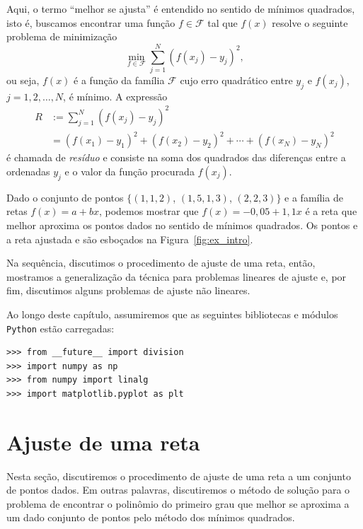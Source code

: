 Aqui, o termo ``melhor se ajusta'' é entendido no sentido de mínimos quadrados, isto é, buscamos encontrar uma função $f\in\mathcal{F}$ tal que $f(x)$ resolve o seguinte problema de minimização
\begin{equation*}
  \min_{f\in\mathcal{F}} \sum_{j=1}^N \left(f(x_j) - y_j\right)^2,
\end{equation*}
ou seja, $f(x)$ é a função da família $\mathcal{F}$ cujo erro quadrático entre $y_j$ e $f(x_j)$, $j = 1, 2, \dotsc, N$, é mínimo. A expressão
\begin{equation*}
  \begin{split}
  R &:= \sum_{j=1}^N \left(f(x_j)-y_j\right)^2 \\
  &= \left(f(x_1)-y_1\right)^2 +  \left(f(x_2)-y_2\right)^2 + \cdots + \left(f(x_N)- y_N\right)^2    
  \end{split}
\end{equation*}
é chamada de \emph{resíduo} e consiste na soma dos quadrados das diferenças entre a ordenadas $y_j$ e o valor da função procurada $f(x_j)$.

\begin{ex}\label{ex:intro_ajuste}
  Dado o conjunto de pontos $\{(1, 1,2)$, $(1,5, 1,3)$, $(2, 2,3)\}$ e a família de retas $f(x) = a + bx$, podemos mostrar que $f(x) = -0,05 + 1,1x$ é a reta que melhor aproxima os pontos dados no sentido de mínimos quadrados.  Os pontos e a reta ajustada e são esboçados na Figura~\ref{fig:ex_intro}.
\end{ex}

Na sequência, discutimos o procedimento de ajuste de uma reta, então, mostramos a generalização da técnica para problemas lineares de ajuste e, por fim, discutimos alguns problemas de ajuste não lineares.

\ifispython
  Ao longo deste capítulo, assumiremos que as seguintes bibliotecas e módulos \verb+Python+ estão carregadas:
\begin{verbatim}
>>> from __future__ import division
>>> import numpy as np
>>> from numpy import linalg
>>> import matplotlib.pyplot as plt
\end{verbatim}
\fi


\section{Ajuste de uma reta}

Nesta seção, discutiremos o procedimento de ajuste de uma reta a um conjunto de pontos dados. Em outras palavras, discutiremos o método de solução para o problema de encontrar o polinômio do primeiro grau que melhor se aproxima a um dado conjunto de pontos pelo método dos mínimos quadrados. 

